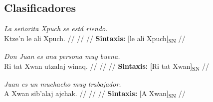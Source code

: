 \documentclass{article}%
\begin{document}
\subsection{Clasificadores}%
\label{subsec:Clasificadores}%

%
\par\medskip%
\ex
\textit{La señorita Xpuch se está riendo.} \\
\begingl
\gla Ktze'n le ali Xpuch. //
\glb  //
\glc  //
\glft \textbf{Sintaxis:} [le ali Xpuch]\textsubscript{SN} //
\endgl
\xe
%
\medskip%
\par\medskip%
\ex
\textit{Don Juan es una persona muy buena.} \\
\begingl
\gla Ri tat Xwan utzalaj winaq. //
\glb  //
\glc  //
\glft \textbf{Sintaxis:} [Ri tat Xwan]\textsubscript{SN} //
\endgl
\xe
%
\medskip%
\par\medskip%
\ex
\textit{Juan es un muchacho muy trabajador.} \\
\begingl
\gla A Xwan sib'alaj ajchak. //
\glb  //
\glc  //
\glft \textbf{Sintaxis:} [A Xwan]\textsubscript{SN} //
\endgl
\xe
%
\medskip

%
\end{document}
